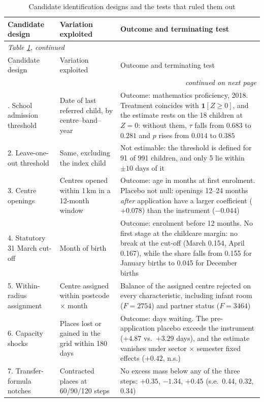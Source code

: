 {\footnotesize
\begin{longtable}{p{3.3cm}p{4.2cm}p{7.1cm}}
\caption{Candidate identification designs and the tests that ruled them out}
\label{tab:designs}\\
\toprule
Candidate design & Variation exploited & Outcome and terminating test \\
\midrule
\endfirsthead
\multicolumn{3}{l}{\emph{Table \ref{tab:designs}, continued}}\\
\toprule
Candidate design & Variation exploited & Outcome and terminating test \\
\midrule
\endhead
\multicolumn{3}{r}{\emph{continued on next page}}\\
\endfoot
\bottomrule
\endlastfoot
1. School admission threshold & Date of last referred child, by centre--band--year & Outcome: mathematics proficiency, 2018. Treatment coincides with $\mathbf{1}[Z\geq 0]$, and the estimate rests on the 18 children at $Z=0$: without them, $\tau$ falls from $0.683$ to $0.281$ and $p$ rises from $0.014$ to $0.385$ \\
2. Leave-one-out threshold & Same, excluding the index child & Not estimable: the threshold is defined for 91 of 991 children, and only 5 lie within $\pm 10$ days of it \\
3. Centre openings & Centres opened within 1\,km in a 12-month window & Outcome: age in months at first enrolment. Placebo not null: openings 12--24 months \emph{after} application have a larger coefficient ($+0.078$) than the instrument ($-0.044$) \\
4. Statutory 31 March cut-off & Month of birth & Outcome: enrolment before 12 months. No first stage at the childcare margin: no break at the cut-off (March 0.154, April 0.167), while the share falls from 0.155 for January births to 0.045 for December births \\
5. Within-radius assignment & Centre assigned within postcode $\times$ month & Balance of the assigned centre rejected on every characteristic, including infant room ($F=2754$) and partner status ($F=3464$) \\
6. Capacity shocks & Places lost or gained in the grid within 180 days & Outcome: days waiting. The pre-application placebo exceeds the instrument ($+4.87$ vs.\ $+3.29$ days), and the estimate vanishes under sector $\times$ semester fixed effects ($+0.42$, n.s.) \\
7. Transfer-formula notches & Contracted places at 60/90/120 steps & No excess mass below any of the three steps: $+0.35$, $-1.34$, $+0.45$ (s.e.\ 0.44, 0.32, 0.34) \\

\end{longtable}}
